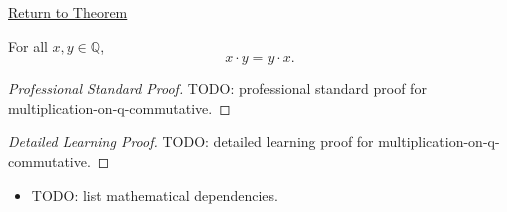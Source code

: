 \newpage
{}
\label{prf:multiplication-on-q-commutative}

\begin{remark*}[Return]
\hyperref[thm:multiplication-on-q-commutative]{Return to Theorem}
\end{remark*}

\begin{theorem*}
For all $x,y\in\mathbb{Q}$,
\[
x\cdot y=y\cdot x.
\]
\end{theorem*}

\begin{proof}[Professional Standard Proof]
\LRAProofBodyStart
TODO: professional standard proof for multiplication-on-q-commutative.
\end{proof}

\begin{proof}[Detailed Learning Proof]
\LRAProofBodyStart
TODO: detailed learning proof for multiplication-on-q-commutative.
\end{proof}

\begin{remark*}
\end{remark*}

\begin{dependencies}
\begin{itemize}
  \item TODO: list mathematical dependencies.
\end{itemize}
\end{dependencies}

\clearpage
